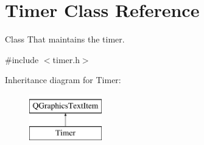 \hypertarget{classTimer}{\section{Timer Class Reference}
\label{classTimer}
}


Class That maintains the timer.  




{\ttfamily \#include $<$timer.\-h$>$}

Inheritance diagram for Timer\-:\begin{figure}[H]
\begin{center}
\leavevmode
\includegraphics[height=2.000000cm]{classTimer}
\end{center}
\end{figure}
